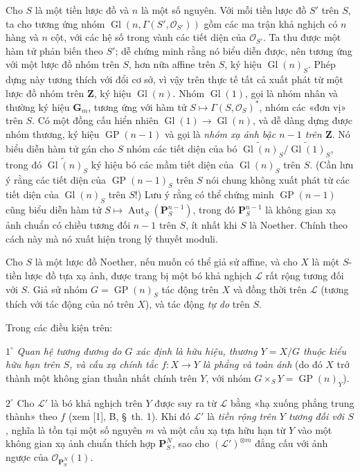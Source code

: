 Cho $S$ là một tiền lược đồ và $n$ là một số nguyên. Với mỗi tiền lược đồ $S'$
trên $S$, ta cho tương ứng nhóm
$\operatorname{Gl}(n,\Gamma(S',\mathcal O_{S'}))$ gồm các ma trận khả nghịch có
$n$ hàng và $n$ cột, với các hệ số trong vành các tiết diện của
$\mathcal O_{S'}$. Ta thu được một hàm tử phản biến theo $S'$; dễ chứng minh
rằng nó biểu diễn được, nên tương ứng với một lược đồ nhóm trên $S$, hơn nữa
affine trên $S$, ký hiệu $\operatorname{Gl}(n)_S$. Phép dựng này tương thích
với đổi cơ sở, vì vậy trên thực tế tất cả xuất phát từ một lược đồ nhóm trên
$\mathbf Z$, ký hiệu $\operatorname{Gl}(n)$. Nhóm $\operatorname{Gl}(1)$, gọi
là nhóm nhân và thường ký hiệu $\mathbf G_m$, tương ứng với hàm tử
$S\longmapsto\Gamma(S,\mathcal O_S)^*$, nhóm các «đơn vị» trên $S$. Có một
đồng cấu hiển nhiên $\operatorname{Gl}(1)\to\operatorname{Gl}(n)$, và dễ dàng
dựng được nhóm thương, ký hiệu $\operatorname{GP}(n-1)$ và gọi là
\emph{nhóm xạ ảnh bậc $n-1$ trên $\mathbf Z$}. Nó biểu diễn hàm tử gán cho
$S$ nhóm các tiết diện của bó
$\widetilde{\operatorname{Gl}(n)}_S/
\widetilde{\operatorname{Gl}(1)}_S$, trong đó
$\widetilde{\operatorname{Gl}(n)}_S$ ký hiệu bó các mầm tiết diện của
$\operatorname{Gl}(n)_S$ trên $S$. (Cần lưu ý rằng các tiết diện của
$\operatorname{GP}(n-1)_S$ trên $S$ nói chung không xuất phát từ các tiết diện
của $\operatorname{Gl}(n)_S$ trên $S$!) Lưu ý rằng có thể chứng minh
$\operatorname{GP}(n-1)$ cũng biểu diễn hàm tử
$S\longmapsto\operatorname{Aut}_S(\mathbf P_S^{n-1})$, trong đó
$\mathbf P_S^{n-1}$ là không gian xạ ảnh chuẩn có chiều tương đối $n-1$ trên
$S$, ít nhất khi $S$ là Noether. Chính theo cách này mà nó xuất hiện trong lý
thuyết moduli.

Cho $S$ là một lược đồ Noether, nếu muốn có thể giả sử affine, và cho $X$ là
một $S$-tiền lược đồ tựa xạ ảnh, được trang bị một bó khả nghịch $\mathcal L$
rất rộng tương đối với $S$. Giả sử nhóm $G=\operatorname{GP}(n)_S$ tác động
trên $X$ và đồng thời trên $\mathcal L$ (tương thích với tác động của nó trên
$X$), và tác động \emph{tự do} trên $S$.

 Trong các điều kiện trên:

\smallskip
\noindent $1^\circ$ \emph{Quan hệ tương đương do $G$ xác định là hữu hiệu,
thương $Y=X/G$ thuộc kiểu hữu hạn trên $S$, và cấu xạ chính tắc $f:X\to Y$ là
phẳng và toàn ánh} (do đó $X$ trở thành một không gian thuần nhất chính trên
$Y$, với nhóm $G\times_S Y=\operatorname{GP}(n)_Y$).

\smallskip
\noindent $2^\circ$ Cho $\mathcal L'$ là bó khả nghịch trên $Y$ được suy ra
từ $\mathcal L$ bằng «hạ xuống phẳng trung thành» theo $f$ (xem [1], B,
\S~th. 1). Khi đó $\mathcal L'$ là \emph{tiền rộng trên $Y$ tương đối với
$S$}, nghĩa là tồn tại một số nguyên $m$ và một cấu xạ tựa hữu hạn từ $Y$ vào
một không gian xạ ảnh chuẩn thích hợp $\mathbf P_S^N$, sao cho
$(\mathcal L')^{\otimes m}$ đẳng cấu với ảnh ngược của
$\mathcal O_{\mathbf P_S^N}(1)$.

